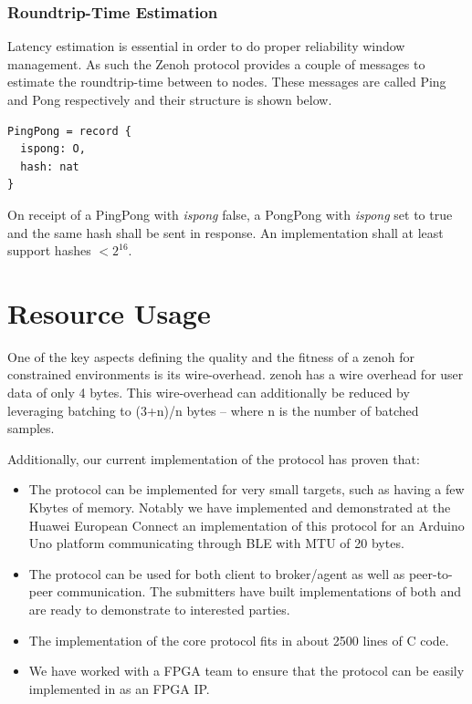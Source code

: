 \documentclass[a4paper,oneside,article]{memoir}
\begin{document}
\subsection{Roundtrip-Time Estimation}

Latency estimation is essential in order to do proper reliability window management.  As such the
Zenoh protocol provides a couple of messages to estimate the roundtrip-time between to nodes.  These
messages are called Ping and Pong respectively and their structure is shown below.
\begin{verbatim}
PingPong = record {
  ispong: O,
  hash: nat
}
\end{verbatim}
On receipt of a PingPong with \emph{ispong} false, a PongPong with \emph{ispong} set to true and the
same hash shall be sent in response.  An implementation shall at least support hashes $< 2^{16}$.


\chapter{Resource Usage}

One of the key aspects defining the quality and the fitness of a zenoh for constrained environments
is its wire-overhead. zenoh has a wire overhead for user data of only 4 bytes. This wire-overhead
can additionally be reduced by leveraging batching to (3+n)/n bytes – where n is the number of
batched samples.

Additionally, our current implementation of the protocol has proven that:
\begin{itemize}
\item The protocol can be implemented for very small targets, such as having a few Kbytes of memory. Notably we have implemented and demonstrated at the Huawei European Connect an implementation of this protocol for an Arduino Uno platform communicating through BLE with MTU of 20 bytes.
\item The protocol can be used for both client to broker/agent as well as peer-to-peer communication. The submitters have built implementations of both and are ready to demonstrate to interested parties.
\item The implementation of the core protocol fits in about 2500 lines of C code. 
\item We have worked with a FPGA team to ensure that the protocol can be easily implemented in as an FPGA IP.
\end{itemize}
\end{document}
